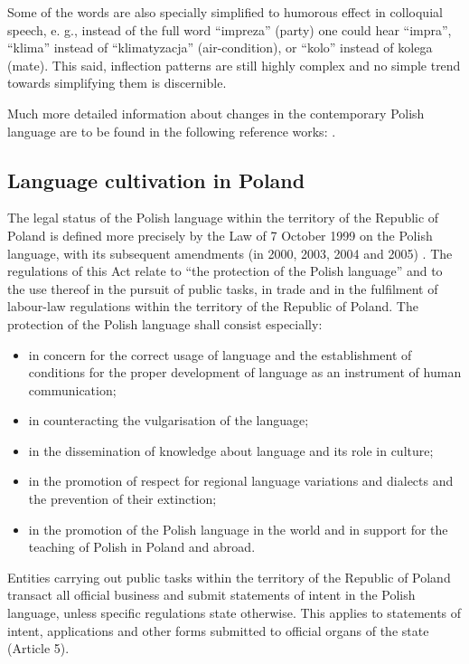 \begin{multicols}{2}
Some of the words are also specially simplified to humorous effect in
colloquial speech, e. g., instead of the full word “impreza”
(party) one could hear “impra”, “klima” instead of
“klimatyzacja” (air-condition), or “kolo” instead of kolega
(mate). This said, inflection patterns are still highly complex and no
simple trend towards simplifying them is discernible. 

Much more detailed information about changes in the contemporary
Polish language are to be found in the following reference works:
\cite{Bralczyk1, Grzenia1, Lazinski1, Mazur1, Bralczyk2}. 

\subsection[Language cultivation in Poland]{Language cultivation in
Poland} 

The legal status of the Polish language within the territory of the
Republic of Poland is defined more precisely by the Law of 7 October
1999 on the Polish language, with its subsequent amendments (in 2000,
2003, 2004 and 2005) \cite{Efnil1}. The regulations of this Act relate
to “the protection of the Polish language” and to the use thereof
in the pursuit of public tasks, in trade and in the fulfilment of
labour-law regulations within the territory of the Republic of Poland.
The protection of the Polish language shall consist especially:
\begin{itemize} \item in concern for the correct usage of language and
the establishment of conditions for the proper development of language
as an instrument of human communication; \item in counteracting the
vulgarisation of the language; \item in the dissemination of knowledge
about language and its role in culture; \item in the promotion of
respect for regional language variations and dialects and the
prevention of their extinction; \item in the promotion of the Polish
language in the world and in support for the teaching of Polish in
Poland and abroad. \end{itemize} 

Entities carrying out public tasks within the territory of the
Republic of Poland transact all official business and submit
statements of intent in the Polish language, unless specific
regulations state otherwise. This applies to statements of intent,
applications and other forms submitted to official organs of the state
(Article 5). 


\end{multicols}

